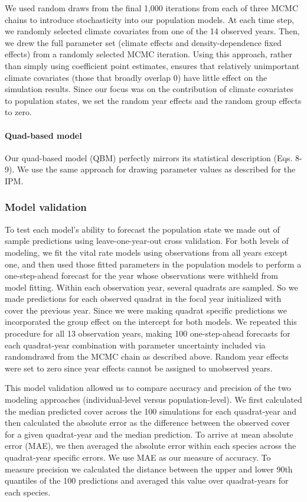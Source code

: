 \documentclass[12pt,]{article}
\begin{document}
We used random draws from the final 1,000 iterations from each of three
MCMC chains to introduce stochasticity into our population models. At
each time step, we randomly selected climate covariates from one of the
14 observed years. Then, we drew the full parameter set (climate effects
and density-dependence fixed effects) from a randomly selected MCMC
iteration. Using this approach, rather than simply using coefficient
point estimates, ensures that relatively unimportant climate covariates
(those that broadly overlap 0) have little effect on the simulation
results. Since our focus was on the contribution of climate covariates
to population states, we set the random year effects and the random
group effects to zero.

\paragraph{Quad-based model}\label{quad-based-model}

Our quad-based model (QBM) perfectly mirrors its statistical description
(Eqs. 8-9). We use the same approach for drawing parameter values as
described for the IPM.

\subsubsection{Model validation}\label{model-validation}

To test each model's ability to forecast the population state we made
out of sample predictions using leave-one-year-out cross validation. For
both levels of modeling, we fit the vital rate models using observations
from all years except one, and then used those fitted parameters in the
population models to perform a one-step-ahead forecast for the year
whose observations were withheld from model fitting. Within each
observation year, several quadrats are sampled. So we made predictions
for each observed quadrat in the focal year initialized with cover the
previous year. Since we were making quadrat specific predictions we
incorporated the group effect on the intercept for both models. We
repeated this procedure for all 13 observation years, making 100
one-step-ahead forecasts for each quadrat-year combination with
parameter uncertainty included via randomdrawd from the MCMC chain as
described above. Random year effects were set to zero since year effects
cannot be assigned to unobserved years.

This model validation allowed us to compare accuracy and precision of
the two modeling approaches (individual-level versus population-level).
We first calculated the median predicted cover across the 100
simulations for each quadrat-year and then calculated the absolute error
as the difference between the observed cover for a given quadrat-year
and the median prediction. To arrive at mean absolute error (MAE), we
then averaged the absolute error within each species across the
quadrat-year specific errors. We use MAE as our measure of accuracy. To
measure precision we calculated the distance between the upper and lower
90th quantiles of the 100 predictions and averaged this value over
quadrat-years for each species.
\end{document}
